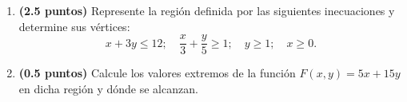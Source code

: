 
\begin{enumerate}[label=\alph*)]
\item \textbf{(2.5 puntos)} Represente la región definida por las siguientes inecuaciones y determine sus vértices:
\[
x+3y\leq12;\quad\frac{x}{3}+\frac{y}{5}\geq1;\quad y\geq1;\quad x\geq0.
\]
\item \textbf{(0.5 puntos)} Calcule los valores extremos de la función $F(x,y)=5x+15y$ en dicha región y dónde se alcanzan.
\end{enumerate}
